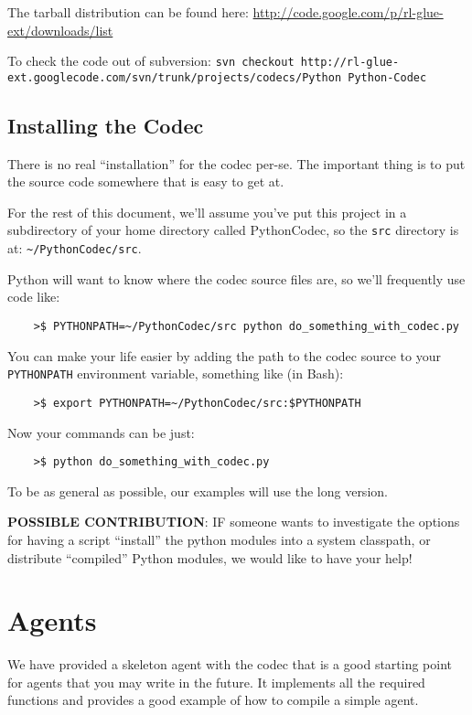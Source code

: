 \documentclass[11pt]{article}
\begin{document}
The tarball distribution can be found here:\newline
\url{http://code.google.com/p/rl-glue-ext/downloads/list}


To check the code out of subversion:\newline
\small\texttt{svn checkout http://rl-glue-ext.googlecode.com/svn/trunk/projects/codecs/Python Python-Codec}\normal

\subsection{Installing the Codec}
There is no real ``installation'' for the codec per-se.  The important thing is to put the source code somewhere that is easy to get at.

For the rest of this document, we'll assume you've put this project in a subdirectory of your home directory called PythonCodec, 
so the \texttt{src} directory is at: \texttt{\~{}/PythonCodec/src}.

Python will want to know where the codec source files are, so we'll frequently use code like:
\begin{verbatim}
	>$ PYTHONPATH=~/PythonCodec/src python do_something_with_codec.py
\end{verbatim}

You can make your life easier by adding the path to the codec source to your \texttt{PYTHONPATH} environment variable, something like (in Bash):
\begin{verbatim}
	>$ export PYTHONPATH=~/PythonCodec/src:$PYTHONPATH
\end{verbatim}

Now your commands can be just:
\begin{verbatim}
	>$ python do_something_with_codec.py
\end{verbatim}

To be as general as possible, our examples will use the long version.


\textbf{POSSIBLE CONTRIBUTION}: IF someone wants to investigate the options for having a script ``install'' the python modules into a system classpath, or distribute 
``compiled'' Python modules, we would like to have your help!



\section{Agents}
\label{sec:agent}
We have provided a skeleton agent with the codec that is a good starting point for agents that you may write in the future.
It implements all the required functions and provides a good example of how to compile a simple agent.
\end{document}
